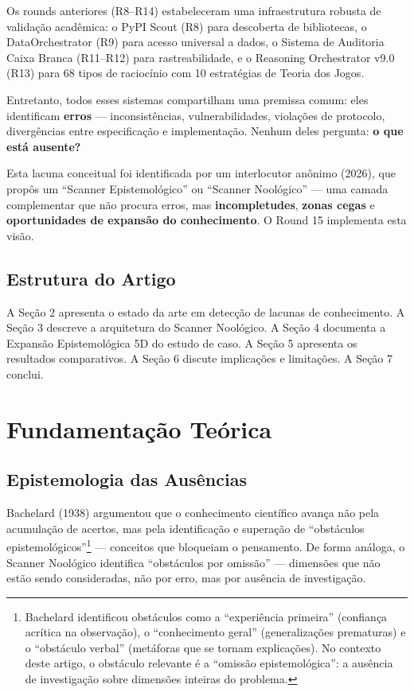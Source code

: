 \documentclass[12pt,a4paper]{article}
\begin{document}
Os rounds anteriores (R8--R14) estabeleceram uma infraestrutura robusta de validação acadêmica: o PyPI Scout (R8) para descoberta de bibliotecas, o DataOrchestrator (R9) para acesso universal a dados, o Sistema de Auditoria Caixa Branca (R11--R12) para rastreabilidade, e o Reasoning Orchestrator v9.0 (R13) para 68 tipos de raciocínio com 10 estratégias de Teoria dos Jogos.

Entretanto, todos esses sistemas compartilham uma premissa comum: eles identificam \textbf{erros} --- inconsistências, vulnerabilidades, violações de protocolo, divergências entre especificação e implementação. Nenhum deles pergunta: \textbf{o que está ausente?}

Esta lacuna conceitual foi identificada por um interlocutor anônimo (2026), que propôs um ``Scanner Epistemológico'' ou ``Scanner Noológico'' --- uma camada complementar que não procura erros, mas \textbf{incompletudes}, \textbf{zonas cegas} e \textbf{oportunidades de expansão do conhecimento}. O Round 15 implementa esta visão.

\subsection{Estrutura do Artigo}

A Seção 2 apresenta o estado da arte em detecção de lacunas de conhecimento. A Seção 3 descreve a arquitetura do Scanner Noológico. A Seção 4 documenta a Expansão Epistemológica 5D do estudo de caso. A Seção 5 apresenta os resultados comparativos. A Seção 6 discute implicações e limitações. A Seção 7 conclui.

\section{Fundamentação Teórica}

\subsection{Epistemologia das Ausências}

Bachelard (1938) argumentou que o conhecimento científico avança não pela acumulação de acertos, mas pela identificação e superação de ``obstáculos epistemológicos''\footnote{Bachelard identificou obstáculos como a ``experiência primeira'' (confiança acrítica na observação), o ``conhecimento geral'' (generalizações prematuras) e o ``obstáculo verbal'' (metáforas que se tornam explicações). No contexto deste artigo, o obstáculo relevante é a ``omissão epistemológica'': a ausência de investigação sobre dimensões inteiras do problema.} --- conceitos que bloqueiam o pensamento. De forma análoga, o Scanner Noológico identifica ``obstáculos por omissão'' --- dimensões que não estão sendo consideradas, não por erro, mas por ausência de investigação.
\end{document}
